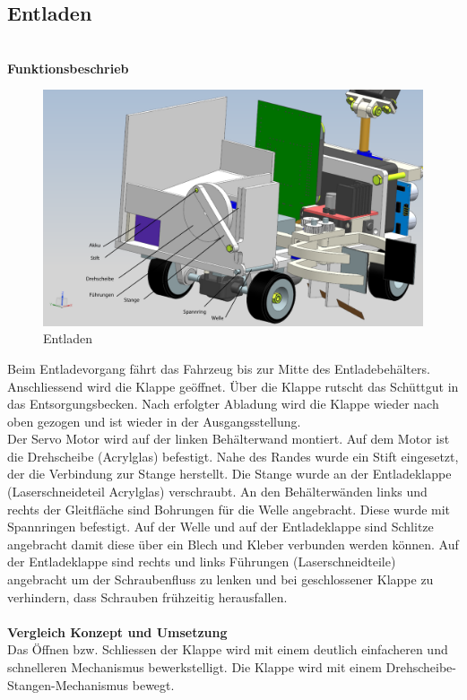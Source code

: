 \subsection{Entladen}
\\
\textbf{Funktionsbeschrieb}
\begin{figure}[H]
\centering
\includegraphics[width=1\textwidth]{03_Loesungskonzept/pictures/entladen12.png}
\caption{Entladen}
\end{figure}
Beim Entladevorgang fährt das Fahrzeug bis zur Mitte des Entladebehälters. Anschliessend wird die Klappe geöffnet. Über die Klappe rutscht das Schüttgut in das Entsorgungsbecken. Nach erfolgter Abladung wird die Klappe wieder nach oben gezogen und ist wieder in der Ausgangsstellung.\\[0.2cm]
Der Servo Motor wird auf der linken Behälterwand montiert. Auf dem Motor ist die Drehscheibe (Acrylglas) befestigt. Nahe des Randes wurde ein Stift eingesetzt, der die Verbindung zur Stange herstellt. Die Stange wurde an der Entladeklappe (Laserschneideteil Acrylglas) verschraubt.
An den Behälterwänden links und rechts der Gleitfläche sind Bohrungen für die Welle angebracht. Diese wurde mit Spannringen befestigt. Auf der Welle und auf der Entladeklappe sind Schlitze angebracht damit diese über ein Blech und Kleber verbunden werden können.
Auf der Entladeklappe sind rechts und links Führungen (Laserschneidteile) angebracht um der Schraubenfluss zu lenken und bei geschlossener Klappe zu verhindern, dass Schrauben frühzeitig herausfallen.\\[0.2cm]
\\
\textbf{Vergleich Konzept und Umsetzung}\\[0.2cm]
Das Öffnen bzw. Schliessen der Klappe wird mit einem deutlich einfacheren und schnelleren Mechanismus bewerkstelligt. Die Klappe wird mit einem Drehscheibe-Stangen-Mechanismus bewegt.
